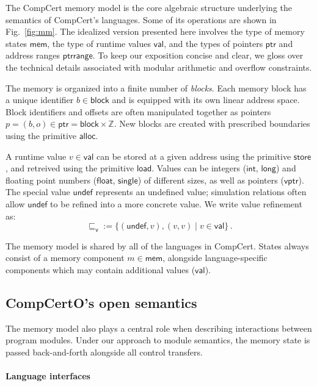 \documentclass[sigplan,10pt,review,anonymous]{acmart}
\newcommand{\kw}[1]{\ensuremath{ \mathsf{#1} }}
\newcommand{\vref}{\sqsubseteq_\kw{v}}
\begin{document}
The CompCert memory model \cite{compcertmm,compcertmmv2}
is the core algebraic structure
underlying the semantics of CompCert's languages.
Some of its operations
are shown in Fig.~\ref{fig:mm}.
The idealized version presented here
involves
the type of memory states \kw{mem},
the type of runtime values \kw{val}, and
the types of pointers \kw{ptr} and address ranges \kw{ptrrange}.
To keep our exposition concise and clear,
we gloss over the technical details
associated with modular arithmetic and overflow constraints.

The memory is organized into a finite number of \emph{blocks}.
Each memory block has a unique identifier $b \in \kw{block}$
and is equipped with its own linear address space.
Block identifiers and offsets are often manipulated together
as pointers $p = (b, o) \in \kw{ptr} = \kw{block} \times \mathbb{Z}$.
New blocks are created with prescribed boundaries
using the primitive $\kw{alloc}$.

A runtime value $v \in \kw{val}$ can be stored at
a given address using the primitive \kw{store},
and retreived using the primitive \kw{load}.
Values can be integers (\kw{int}, \kw{long}) and
floating point numbers (\kw{float}, \kw{single})
of different sizes,
as well as pointers (\kw{vptr}).
The special value \kw{undef}
represents an undefined value;
simulation relations
often allow $\kw{undef}$
to be refined into a more concrete value.
We write value refinement as:
\[
    {\vref} := \{(\kw{undef}, v), (v, v) \mid v \in \kw{val}\} \,.
\]

The memory model is shared by all of the languages in CompCert.
States always consist of
a memory component $m \in \kw{mem}$,
alongside language-specific components
which may contain additional values ($\kw{val}$).


\subsection{CompCertO's open semantics} \label{sec:sem:open} %

The memory model also plays a central role
when describing interactions between program modules.
Under our approach to module semantics,
the memory state is passed back-and-forth
alongside all control transfers.

\paragraph{Language interfaces} %
\end{document}
